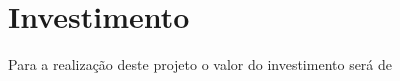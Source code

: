 \chapter[Investimento]{Investimento}

Para a realização deste projeto o valor do investimento será de 







